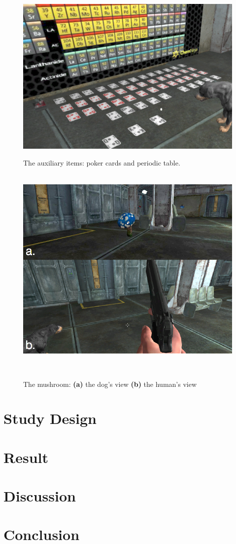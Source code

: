 \documentclass{sigchi}
\begin{document}
\begin{figure}[H]
        \centering
        \includegraphics[width=\linewidth]{images/auxiliary_items.png}
        \caption{The auxiliary items: poker cards and periodic table.}
        \label{fig:auxiliary_items}
    \endminipage
    ~ %
        \centering
        \includegraphics[width=\linewidth]{images/puzzle3_2.png}
        \caption{The mushroom: \textbf{(a)}  the dog's view \textbf{(b)} the human's view}
        \label{fig:puzzle3}
    \endminipage
    ~ %
\end{figure}

\section{Study Design}


\section{Result}
\section{Discussion}
\section{Conclusion}



\end{document}

